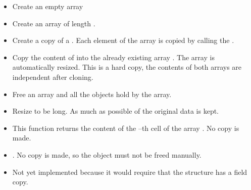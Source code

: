 \begin{itemize}
\item {}
  \sshortdescribe Create an empty array
\item {}
  \sshortdescribe Create an array of length .
\item {}
  \sshortdescribe Create a copy of a \PnlArray. Each element of the
  array  is copied by calling the .
\item {}
  \sshortdescribe Copy the content of  into the already existing
  array . The array  is automatically resized. This is a
  hard copy, the contents of both arrays are independent after cloning.
\item {}
  \sshortdescribe Free an array and all the objects hold by the array.
\item {}
  \sshortdescribe Resize  to be  long. As much as possible of
  the original data is kept.
\item {}
  \sshortdescribe This function returns the content of the --th cell of
  the array . No copy is made.
\item {}
  \sshortdescribe {}. No copy is made, so the object  must
  not be freed manually.
\item {}
  \sshortdescribe Not yet implemented because it would require that the
  structure \PnlObject has a field copy.
\end{itemize}


